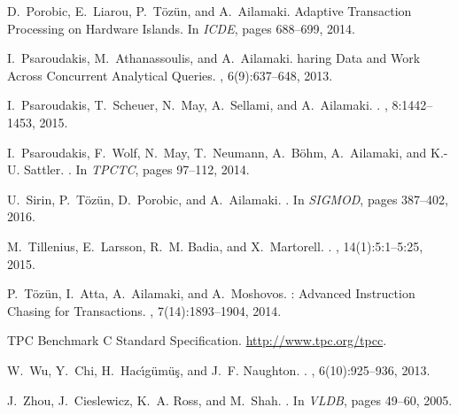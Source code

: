 \documentclass[11pt]{article}
\begin{document}
\begin{thebibliography}{10}
\begin{small}
D.~Porobic, E.~Liarou, P.~T\"oz\"un, and A.~Ailamaki.
 {A}daptive {T}ransaction {P}rocessing on {H}ardware
  {I}slands.
\newblock In {\em ICDE}, pages 688--699, 2014.

I.~Psaroudakis, M.~Athanassoulis, and A.~Ailamaki.
haring {D}ata and {W}ork {A}cross {C}oncurrent {A}nalytical
  {Q}ueries.
, 6(9):637--648, 2013.

I.~Psaroudakis, T.~Scheuer, N.~May, A.~Sellami, and A.~Ailamaki.
.
, 8:1442--1453, 2015.

I.~Psaroudakis, F.~Wolf, N.~May, T.~Neumann, A.~B{\"o}hm, A.~Ailamaki, and
  K.-U. Sattler.
.
\newblock In {\em TPCTC}, pages 97--112, 2014.

U.~Sirin, P.~T{\"{o}}z{\"{u}}n, D.~Porobic, and A.~Ailamaki.
.
\newblock In {\em SIGMOD}, pages 387--402, 2016.

M.~Tillenius, E.~Larsson, R.~M. Badia, and X.~Martorell.
.
, 14(1):5:1--5:25, 2015.

P.~T\"oz\"un, I.~Atta, A.~Ailamaki, and A.~Moshovos.
: {A}dvanced {I}nstruction {C}hasing for {T}ransactions.
, 7(14):1893--1904, 2014.

{TPC} {B}enchmark {C} {S}tandard {S}pecification.
\newblock \url{http://www.tpc.org/tpcc}.

W.~Wu, Y.~Chi, H.~Hac\'{\i}g\"{u}m\"{u}\c{s}, and J.~F. Naughton.
.
, 6(10):925--936, 2013.

J.~Zhou, J.~Cieslewicz, K.~A. Ross, and M.~Shah.
.
\newblock In {\em VLDB}, pages 49--60, 2005.
\end{small}
\end{thebibliography} 
\end{document}
